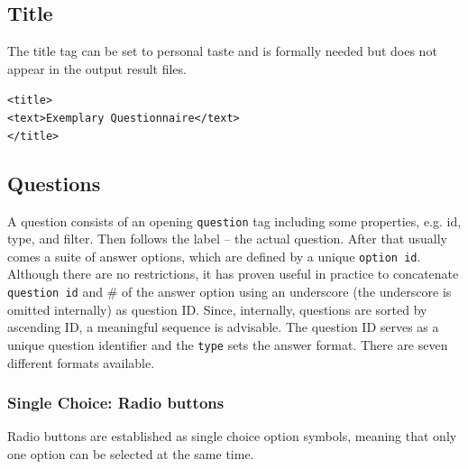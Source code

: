 \documentclass[11pt,a4paper,titlepage]{article}
\begin{document}
\subsection{Title}

The title tag can be set to personal taste and is formally needed but does not appear in the output result files.

\begin{center}
\begin{tcolorbox}[colback=black!10!white,colframe=black!50!white, boxsep=1pt,left=4pt,right=4pt,top=4pt,bottom=2pt]
\texttt{<title>\\
\hspace*{0.5cm}<text>Exemplary Questionnaire</text>\\
</title>}
\end{tcolorbox}
\end{center}


\subsection{Questions}

A question consists of an opening \texttt{question} tag including some properties, e.g. id, type, and filter. Then follows the label -- the actual question. After that usually comes a suite of answer options, which are defined by a unique \texttt{option id}. Although there are no restrictions, it has proven useful in practice to concatenate \texttt{question id} and \# of the answer option using an underscore (the underscore is omitted internally) as question ID. Since, internally, questions are sorted by ascending ID, a meaningful sequence is advisable. The question ID serves as a unique question identifier and the \texttt{type} sets the answer format. There are seven different formats available.


\subsubsection{Single Choice: Radio buttons}

Radio buttons are established as single choice option symbols, meaning that only one option can be selected at the same time.
\end{document}
